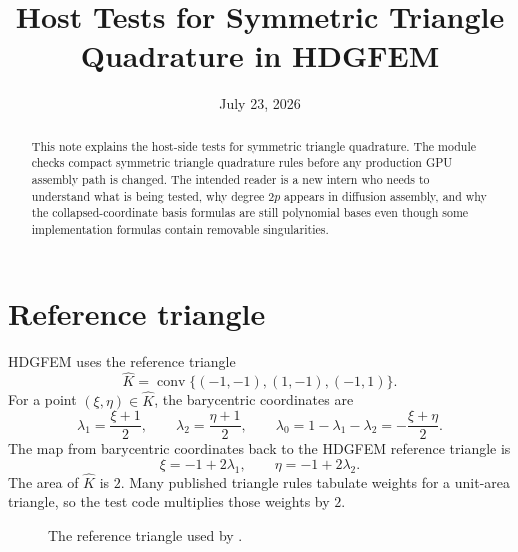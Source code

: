 \documentclass[11pt]{article}
\title{Host Tests for Symmetric Triangle Quadrature in HDGFEM}
\author{}
\date{July 23, 2026}
\newcommand{\code}[1]{\texttt{\detokenize{#1}}}
\newcommand{\Khat}{\widehat K}
\newcommand{\lam}{\lambda}
\begin{document}
\maketitle

\begin{abstract}
This note explains the host-side tests for symmetric triangle quadrature.  The
module checks compact symmetric triangle quadrature rules before any production
GPU assembly path is changed.  The intended reader is a new intern who needs to
understand what is being tested, why degree \(2p\) appears in diffusion
assembly, and why the collapsed-coordinate basis formulas are still polynomial
bases even though some implementation formulas contain removable singularities.
\end{abstract}

\tableofcontents

\section{Reference triangle}

HDGFEM uses the reference triangle
\[
  \Khat = \operatorname{conv}\{(-1,-1), (1,-1), (-1,1)\}.
\]
For a point \((\xi,\eta)\in\Khat\), the barycentric coordinates are
\[
  \lam_1 = \frac{\xi+1}{2},\qquad
  \lam_2 = \frac{\eta+1}{2},\qquad
  \lam_0 = 1-\lam_1-\lam_2 = -\frac{\xi+\eta}{2}.
\]
The map from barycentric coordinates back to the HDGFEM reference triangle is
\[
  \xi=-1+2\lam_1,\qquad \eta=-1+2\lam_2.
\]
The area of \(\Khat\) is \(2\).  Many published triangle rules tabulate
weights for a unit-area triangle, so the test code multiplies those weights by
\(2\).

\begin{figure}[htbp]
\centering
{}
\caption{The reference triangle used by \code{hdgfem/core/quadrature.py}.}
\label{fig:reference-triangle}
\end{figure}
\end{document}
